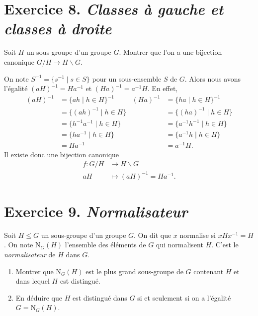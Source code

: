 \documentclass[./main]{subfiles}
\begin{document}
  \section{Exercice 8. \textit{Classes à gauche et classes à droite}}
  \begin{enonce}
    Soit $H$ un sous-groupe d'un groupe $G$. Montrer que l'on a une bijection canonique $G / H \to H \backslash G$.
  \end{enonce}

  On note $S^{-1} = \{s^{-1} \mid s \in S \}$ pour un sous-ensemble $S$ de $G$.
  Alors nous avons l'égalité $(aH)^{-1} = Ha^{-1}$ et $(Ha)^{-1} = a^{-1}H$.
  En effet, 
  \begin{align*}
    (aH)^{-1} &= \{a h  \mid h \in H\}^{-1} & (Ha)^{-1} &= \{ha  \mid h \in H\}^{-1}\\
    &= \{(ah)^{-1}  \mid h \in H\} &&= \{(ha)^{-1}  \mid h \in H\} \\
    &= \{h^{-1}a^{-1} \mid h \in H\} &&= \{a^{-1} h^{-1}  \mid h \in H\} \\
    &= \{h a^{-1}  \mid h \in H\} &&= \{a^{-1}h  \mid h \in H\} \\
    &= Ha^{-1} &&= a^{-1}H
  .\end{align*}
  Il existe donc une bijection canonique \begin{align*}
    f: G / H &\longrightarrow H \backslash G \\
    aH &\longmapsto (aH)^{-1} = Ha^{-1}
  .\end{align*}

  \section{Exercice 9. \textit{Normalisateur}}
  \begin{enonce}
    Soit $H \le G$ un sous-groupe d'un groupe $G$. On dit que $x$ normalise si $x H x^{-1} = H$. On note $\mathrm{N}_G(H)$ l'ensemble des éléments de $G$ qui normalisent $H$.
    C'est le \textit{normalisateur} de $H$ dans $G$.
    \begin{enumerate}
      \item Montrer que $\mathrm{N}_G(H)$ est le plus grand sous-groupe de $G$ contenant $H$ et dans lequel $H$ est distingué.
      \item En déduire que $H$ est distingué dans $G$ si et seulement si on a l'égalité $G = \mathrm{N}_G(H)$.
    \end{enumerate}
  \end{enonce}
\end{document}
